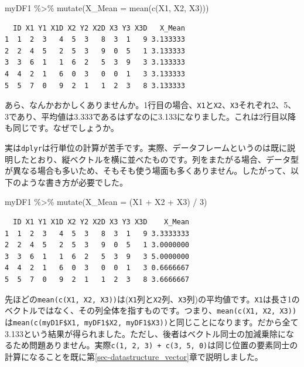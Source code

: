 \documentclass[
  a4paper,
  pandoc,
  ja=standard,
  jafont=haranoaji]{bxjsbook}
\newenvironment{Shaded}{\begin{snugshade}}{\end{snugshade}}
\newcommand{\AttributeTok}[1]{\textcolor[rgb]{0.00,0.48,0.65}{#1}}
\newcommand{\DecValTok}[1]{\textcolor[rgb]{0.68,0.00,0.00}{#1}}
\newcommand{\FunctionTok}[1]{\textcolor[rgb]{0.28,0.35,0.67}{#1}}
\newcommand{\NormalTok}[1]{\textcolor[rgb]{0.00,0.48,0.65}{#1}}
\newcommand{\SpecialCharTok}[1]{\textcolor[rgb]{0.37,0.37,0.37}{#1}}
\begin{document}
\begin{Shaded}
\begin{Highlighting}[numbers=left,,]
\NormalTok{myDF1 }\SpecialCharTok{\%\textgreater{}\%}
  \FunctionTok{mutate}\NormalTok{(}\AttributeTok{X\_Mean =} \FunctionTok{mean}\NormalTok{(}\FunctionTok{c}\NormalTok{(X1, X2, X3)))}
\end{Highlighting}
\end{Shaded}

\begin{verbatim}
  ID X1 Y1 X1D X2 Y2 X2D X3 Y3 X3D   X_Mean
1  1  2  3   4  5  3   8  3  1   9 3.133333
2  2  4  5   2  5  3   9  0  5   1 3.133333
3  3  6  1   1  6  2   5  3  9   3 3.133333
4  4  2  1   6  0  3   0  0  1   3 3.133333
5  5  7  0   9  2  1   1  2  3   8 3.133333
\end{verbatim}

あら、なんかおかしくありませんか。1行目の場合、\texttt{X1}と\texttt{X2}、\texttt{X3}それぞれ2、5、3であり、平均値は3.333であるはずなのに3.133になりました。これは2行目以降も同じです。なぜでしょうか。

実は\texttt{dplyr}は行単位の計算が苦手です。実際、データフレームというのは既に説明したとおり、縦ベクトルを横に並べたものです。列をまたがる場合、データ型が異なる場合も多いため、そもそも使う場面も多くありません。したがって、以下のような書き方が必要でした。

\begin{Shaded}
\begin{Highlighting}[numbers=left,,]
\NormalTok{myDF1 }\SpecialCharTok{\%\textgreater{}\%}
  \FunctionTok{mutate}\NormalTok{(}\AttributeTok{X\_Mean =}\NormalTok{ (X1 }\SpecialCharTok{+}\NormalTok{ X2 }\SpecialCharTok{+}\NormalTok{ X3) }\SpecialCharTok{/} \DecValTok{3}\NormalTok{)}
\end{Highlighting}
\end{Shaded}

\begin{verbatim}
  ID X1 Y1 X1D X2 Y2 X2D X3 Y3 X3D    X_Mean
1  1  2  3   4  5  3   8  3  1   9 3.3333333
2  2  4  5   2  5  3   9  0  5   1 3.0000000
3  3  6  1   1  6  2   5  3  9   3 5.0000000
4  4  2  1   6  0  3   0  0  1   3 0.6666667
5  5  7  0   9  2  1   1  2  3   8 3.6666667
\end{verbatim}

先ほどの\texttt{mean(c(X1,\ X2,\ X3))}は(\texttt{X1}列と\texttt{X2}列、\texttt{X3}列)の平均値です。\texttt{X1}は長さ1のベクトルではなく、その列全体を指すものです。つまり、\texttt{mean(c(X1,\ X2,\ X3))}は\texttt{mean(c(myD1F\$X1,\ myDF1\$X2,\ myDF1\$X3))}と同じことになります。だから全て3.133という結果が得られました。ただし、後者はベクトル同士の加減乗除になるため問題ありません。実際\texttt{c(1,\ 2,\ 3)\ +\ c(3,\ 5,\ 0)}は同じ位置の要素同士の計算になることを既に第\ref{sec-datastructure_vector}章で説明しました。
\end{document}
